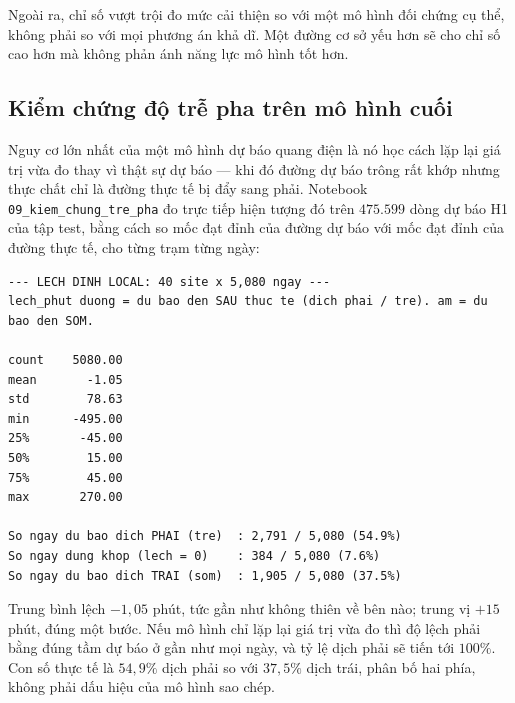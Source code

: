 \documentclass[12pt, a4paper]{report}
\begin{document}
Ngoài ra, chỉ số vượt trội đo mức cải thiện so với một mô hình đối chứng cụ thể, không
phải so với mọi phương án khả dĩ. Một đường cơ sở yếu hơn sẽ cho chỉ số cao hơn mà không phản
ánh năng lực mô hình tốt hơn.

\FloatBarrier
\subsection{Kiểm chứng độ trễ pha trên mô hình cuối}

Nguy cơ lớn nhất của một mô hình dự báo quang điện là nó học cách lặp lại giá trị vừa đo thay
vì thật sự dự báo --- khi đó đường dự báo trông rất khớp nhưng thực chất chỉ là đường thực tế
bị đẩy sang phải. Notebook \texttt{09\_kiem\_chung\_tre\_pha} đo trực tiếp hiện tượng đó trên
$475.599$ dòng dự báo H1 của tập test, bằng cách so mốc đạt đỉnh của đường dự báo với mốc đạt
đỉnh của đường thực tế, cho từng trạm từng ngày:

\begingroup
\par{}\vspace{8pt}
\scriptsize\renewcommand{\baselinestretch}{1.0}\selectfont
\begin{verbatim}
--- LECH DINH LOCAL: 40 site x 5,080 ngay ---
lech_phut duong = du bao den SAU thuc te (dich phai / tre). am = du bao den SOM.

count    5080.00
mean       -1.05
std        78.63
min      -495.00
25%       -45.00
50%        15.00
75%        45.00
max       270.00

So ngay du bao dich PHAI (tre)  : 2,791 / 5,080 (54.9%)
So ngay dung khop (lech = 0)    : 384 / 5,080 (7.6%)
So ngay du bao dich TRAI (som)  : 1,905 / 5,080 (37.5%)
\end{verbatim}
\par\vspace{8pt}
\endgroup
Trung bình lệch $-1{,}05$ phút, tức gần như không thiên về bên nào; trung vị $+15$ phút, đúng
một bước. Nếu mô hình chỉ lặp lại giá trị vừa đo thì độ lệch phải bằng đúng tầm dự báo ở gần
như mọi ngày, và tỷ lệ dịch phải sẽ tiến tới $100\%$. Con số thực tế là $54{,}9\%$ dịch phải so
với $37{,}5\%$ dịch trái, phân bố hai phía, không phải dấu hiệu của mô hình sao chép.
\end{document}
